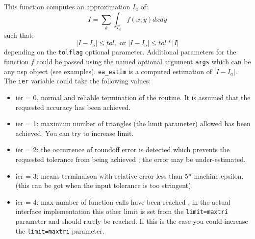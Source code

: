\begin{mandescription}
This function computes an approximation $I_a$ of:
$$
   I = \sum_k \int_{T_k} f(x,y) dxdy
$$
such that:
$$
   | I - I_a | \le  tol, \mbox{ or } | I - I_a | \le  tol*|I|
$$
depending on the \verb+tolflag+ optional parameter.
Additional parameters for the function $f$ could be passed using the
named optional argument \verb+args+ which can be any nsp object (see
examples). \verb+ea_estim+ is a computed estimation of $| I - I_a |$. The
\verb+ier+ variable could take the following values: 
\begin{itemize}
\item ier = 0,  normal and reliable termination of the routine. It is assumed that the
      requested  accuracy has been achieved.
\item ier = 1: maximum number of triangles (the limit
      parameter) allowed has been achieved. You can try to
      increase limit.
\item ier = 2: the occurrence of roundoff error is detected
      which prevents the requested tolerance from being
      achieved ; the error may be under-estimated.
\item ier = 3: means terminaison with relative error less than 5* machine epsilon.
      (this can be got when the input tolerance is too stringent).
\item ier = 4: max number of function calls have been reached ;
      in the actual interface implementation this other limit is set
      from the \verb+limit=maxtri+ parameter and should rarely be
      reached. If this is the case you could increase the
      \verb+limit=maxtri+ parameter.
\end{itemize}

\end{mandescription}

